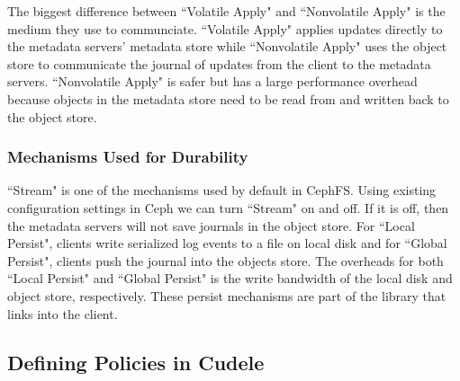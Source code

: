 The biggest difference between ``Volatile Apply" and ``Nonvolatile Apply" is
the medium they use to communciate. ``Volatile Apply" applies updates directly
to the metadata servers' metadata store while ``Nonvolatile Apply" uses the
object store to communicate the journal of updates from the client to the
metadata servers.  ``Nonvolatile Apply" is safer but has a large performance
overhead because objects in the metadata store need to be read from and written
back to the object store.


\subsubsection{Mechanisms Used for Durability} ``Stream" is one of the
mechanisms used by default in CephFS.  Using existing configuration settings in
Ceph we can turn ``Stream" on and off.  If it is off, then the metadata servers
will not save journals in the object store. For ``Local Persist", clients write
serialized log events to a file on local disk and for ``Global Persist",
clients push the journal into the objects store. The overheads for both ``Local
Persist" and ``Global Persist" is the write bandwidth of the local disk and
object store, respectively.  These persist mechanisms are part of the library that
links into the client.

\subsection{Defining Policies in Cudele}
\label{sec:setting-policies-with-cudele}

